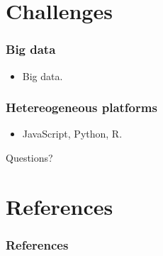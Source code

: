 \documentclass{beamer}
\begin{document}
\section{Challenges}

\begin{frame}[t, allowframebreaks]
    \frametitle{Big data}
    \begin{itemize}
        \item Big data.
    \end{itemize}
\end{frame}



\begin{frame}[t, allowframebreaks]
    \frametitle{Hetereogeneous platforms}
    \begin{itemize}
        \item JavaScript, Python, R.
    \end{itemize}
\end{frame}








\begin{frame}
    Questions?
\end{frame}



\section{References}

\begin{frame}[t, allowframebreaks]
    \frametitle{References}
    
    
\end{frame}
\end{document}

